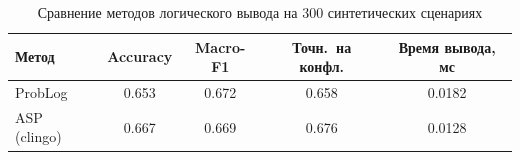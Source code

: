 \begin{table}[H]
\centering
\caption{Сравнение методов логического вывода на 300 синтетических сценариях}
\label{tab:metrics}
\begin{tabular}{lcccc}
\toprule
Метод & Accuracy & Macro-F1 & Точн.\ на конфл. & Время вывода, мс \\
\midrule
ProbLog & 0.653 & 0.672 & 0.658 & 0.0182 \\
ASP (clingo) & 0.667 & 0.669 & 0.676 & 0.0128 \\
\bottomrule
\end{tabular}
\end{table}